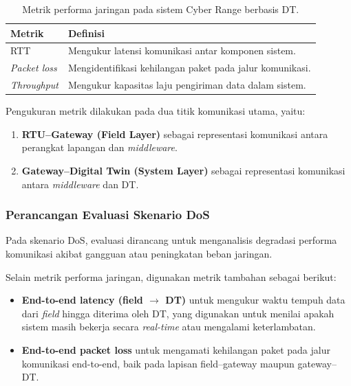 \renewcommand{\arraystretch}{1.3}
\begin{table}[htbp]
    \centering
    \caption{Metrik performa jaringan pada sistem Cyber Range berbasis DT.}
    \label{tab:metrik_performa_jaringan}
    \begin{tabular}{|l|p{10cm}|}
        \hline
        \textbf{Metrik} & \textbf{Definisi} \\
        \hline
        RTT & Mengukur latensi komunikasi antar komponen sistem. \\
        \hline
        \textit{Packet loss} & Mengidentifikasi kehilangan paket pada jalur komunikasi. \\
        \hline
        \textit{Throughput} & Mengukur kapasitas laju pengiriman data dalam sistem. \\
        \hline
    \end{tabular}
\end{table}

Pengukuran metrik dilakukan pada dua titik komunikasi utama, yaitu:
\begin{enumerate}
    \item \textbf{RTU--Gateway (Field Layer)} sebagai representasi komunikasi antara perangkat lapangan dan \textit{middleware}.
    \item \textbf{Gateway--Digital Twin (System Layer)} sebagai representasi komunikasi antara \textit{middleware} dan DT.
\end{enumerate}

\subsubsection{Perancangan Evaluasi Skenario DoS}
Pada skenario DoS, evaluasi dirancang untuk menganalisis degradasi performa komunikasi akibat gangguan atau peningkatan beban jaringan.

Selain metrik performa jaringan, digunakan metrik tambahan sebagai berikut:
\begin{itemize}
    \item \textbf{End-to-end latency (field $\rightarrow$ DT)} untuk mengukur waktu tempuh data dari \textit{field} hingga diterima oleh DT, yang digunakan untuk menilai apakah sistem masih bekerja secara \textit{real-time} atau mengalami keterlambatan.
    
    \item \textbf{End-to-end packet loss} untuk mengamati kehilangan paket pada jalur komunikasi end-to-end, baik pada lapisan field--gateway maupun gateway--DT.
\end{itemize}

